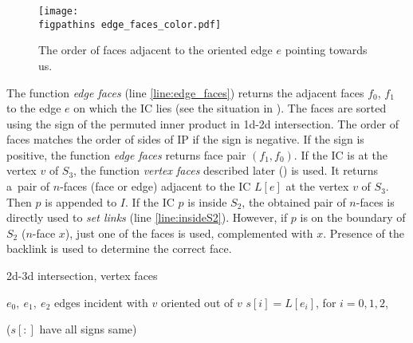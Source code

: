 \begin{figure}[!htb]
  \begin{center}        
    \texttt{[image: \\figpathins edge\_faces\_color.pdf]}
  \end{center}
  \caption[Order of faces adjacent to the oriented edge.]
  {The order of faces adjacent to the oriented edge $e$ pointing towards us.}
  \label{fig:edge_faces}
\end{figure}

The function \emph{edge faces} (line \ref{line:edge_faces}) returns the adjacent faces $f_0$, $f_1$ to the edge $e$
on which the IC lies (see the situation in ). 
The faces are sorted using the sign of the permuted inner product in 1d-2d intersection. The order of faces matches 
the order of sides of IP if the sign is negative. If the sign is positive, the function \emph{edge faces} returns face pair $(f_1, f_0)$.
If the IC is at the vertex $v$ of $S_3$, the function \emph{vertex faces} described later () is used.
It returns a~pair of $n$-faces (face or edge) adjacent to the IC $L[e]$ at the vertex $v$ of $S_3$. 
Then $p$ is appended to $I$. If the IC $p$ is inside $S_2$, the obtained pair of $n$-faces is directly used to \emph{set links} (line \ref{line:insideS2}).
However, if $p$ is on the boundary of $S_2$ ($n$-face $x$), just one of the faces is used, complemented with $x$. Presence of the backlink 
is used to determine the correct face. 


\begin{algorithm}
  \caption{2d-3d intersection, vertex faces}  
  \label{algo:vertex_faces}
  
  \DontPrintSemicolon
  $e_0,\ e_1,\ e_2$ edges incident with $v$ oriented out of $v$\;   
  $s[i] = L[e_i]$, for $i=0,1,2$, \;


  
  
  \Else($s[:]$ have all signs same){ 
    \;
  }  
\end{algorithm}

